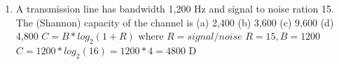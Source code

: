 \documentclass{article}
\begin{document}
\begin{enumerate}
            (d) 15
            \newline
            D
        \item A transmission line has bandwidth 1,200 Hz and signal to noise ration 15. The (Shannon) capacity of the channel is
            \newline
            (a) 2,400
            \newline
            (b) 3,600
            \newline
            (c) 9,600
            \newline
            (d) 4,800
            \newline
            $C = B * log_2(1+R)$ where $R = signal/noise$
            \newline
            $R = 15, B = 1200$
            \newline
            $C = 1200 * log_2(16) = 1200 * 4 = 4800$
            \newline
            D
    \end{enumerate}
\end{document}
